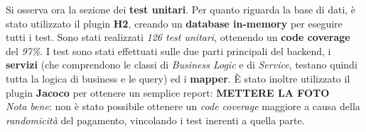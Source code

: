 \documentclass{article}
\begin{document}
Si osserva ora la sezione dei \textbf{test unitari}. Per quanto riguarda la base di dati, è stato utilizzato il plugin \textbf{H2}, creando un \textbf{database in-memory} per eseguire tutti i test. Sono stati realizzati \textit{126 test unitari}, ottenendo un \textbf{code coverage} del \textit{97\%}. I test sono stati effettuati sulle due parti principali del backend, i \textbf{servizi} (che comprendono le classi di \textit{Business Logic} e di \textit{Service}, testano quindi tutta la logica di business e le query) ed i \textbf{mapper}. È stato inoltre utilizzato il plugin \textbf{Jacoco} per ottenere un semplice report:
\textbf{METTERE LA FOTO}\vspace*{7pt}\\
\textit{Nota bene}: non è stato possibile ottenere un \textit{code coverage} maggiore a causa della \textit{randomicità} del pagamento, vincolando i test inerenti a quella parte.
\end{document}
